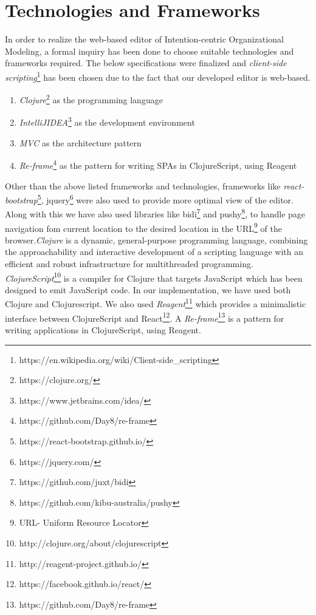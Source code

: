 \section{Technologies and Frameworks}
\label{subsec:specifications}
In order to realize the web-based editor of Intention-centric Organizational Modeling, a formal inquiry has been done to choose suitable technologies and frameworks required. The below specifications were finalized and \textit{client-side scripting}\footnote{https://en.wikipedia.org/wiki/Client-side\_scripting} has been chosen due to the fact that our developed editor is web-based. 

\begin{enumerate}   
	\item \textit{Clojure}\footnote{https://clojure.org/} as the programming language
	\item \textit{IntelliJIDEA}\footnote{https://www.jetbrains.com/idea/} as the development environment
	\item \textit{MVC}  as the architecture pattern
	\item \textit{Re-frame}\footnote{https://github.com/Day8/re-frame} as the pattern for writing SPAs in ClojureScript, using Reagent	
\end{enumerate}

Other than the above listed frameworks and technologies, frameworks like \textit{react-bootstrap}\footnote{https://react-bootstrap.github.io/}, jquery\footnote{https://jquery.com/} were also used to provide more optimal view of the editor. Along with this we have also used libraries like bidi\footnote{https://github.com/juxt/bidi} and pushy\footnote{https://github.com/kibu-australia/pushy}, to handle page navigation fom current location to the desired location in the URL\footnote{URL- Uniform Resource Locator} of the browser.\textit{Clojure} is a dynamic, general-purpose programming language, combining the approachability and interactive development of a scripting language with an efficient and robust infrastructure for multithreaded programming. \textit{ClojureScript}\footnote{http://clojure.org/about/clojurescript} is a compiler for Clojure that targets JavaScript which has been designed to emit JavaScript code. In our implementation, we have used both Clojure and Clojurescript. We also used \textit{Reagent}\footnote{http://reagent-project.github.io/} which provides a minimalistic interface between ClojureScript and React\footnote{https://facebook.github.io/react/}. A \textit{Re-frame}\footnote{https://github.com/Day8/re-frame} is a pattern for writing applications in ClojureScript, using Reagent.

